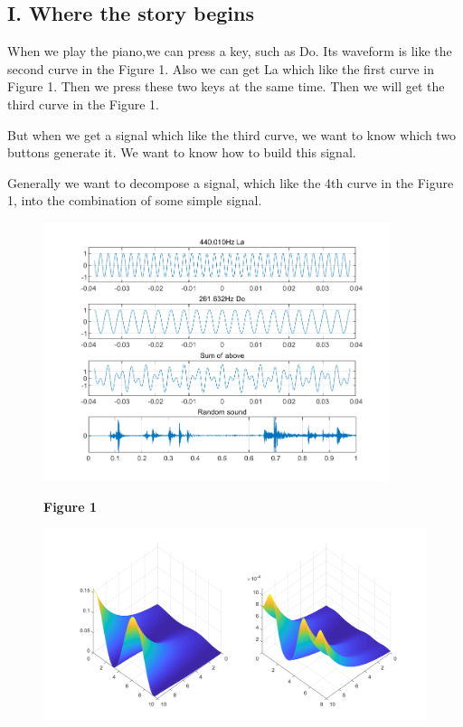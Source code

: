 \documentclass[margin,line]{res}
\begin{document}
\begin{resume}
\section{\sc I. Where the story begins}
When we play the piano,we can press a key, such as Do. Its waveform is like the second curve in the Figure 1. Also we can get La which like the first curve in Figure 1. Then we press these two keys at the same time. Then we will get the third curve in the Figure 1.\par
But when we get a signal which like the third curve, we want to know which two buttons generate it. We want to know how to build this signal.\par
Generally we want to decompose a signal, which like the 4th curve in the Figure 1, into the combination of some simple signal.\par
\begin{figure}[H]
  \begin{minipage}{0.42\linewidth}
    \centerline{\includegraphics[width=0.9\textwidth]{figure/fig_1.png}}
    \centerline{\textbf{Figure 1}}
  \end{minipage}
  \begin{minipage}{0.55\linewidth}
    \centerline{\includegraphics[width=\textwidth]{figure/fig_2.png}}

\end{minipage}
\end{figure}
\end{resume}
\end{document}
